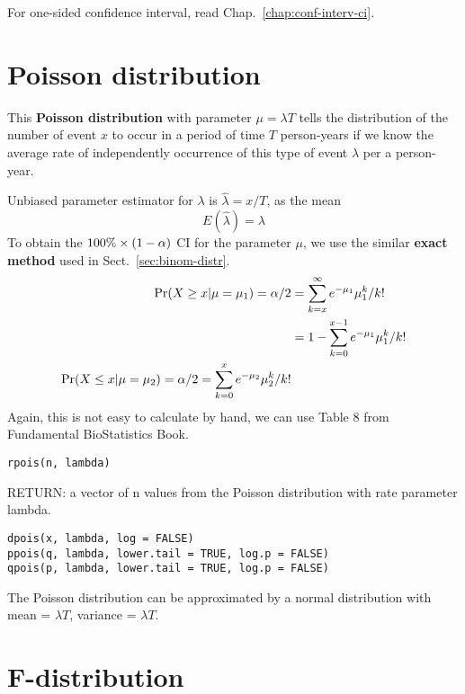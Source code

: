 For one-sided confidence interval, read
Chap.~\ref{chap:conf-interv-ci}. 

\section{Poisson distribution}
\label{sec:poisson-distribution}

This {\bf Poisson distribution} with parameter $\mu=\lambda T$ tells
the distribution of the number of event $x$ to occur in a period of
time $T$ person-years if we know the average rate of independently
occurrence of this type of event $\lambda$ per a person-year.

Unbiased parameter estimator for $\lambda$ is $\hat{\lambda} =
x/T$, as the mean
\begin{equation}
  \label{eq:53}
  E(\hat{\lambda}) = \lambda
\end{equation}
To obtain the $100\%\times (1-\alpha)$ CI for the parameter $\mu$, we use the similar
{\bf exact method} used in Sect.~\ref{sec:binom-distr}.
\begin{equation}
  \label{eq:54}
  \begin{split}
    \text{Pr}(X\ge x|\mu=\mu_1) = \alpha/2 &= \sum^\infty_{k=x} 
    e^{-\mu_1} \mu_1^{k}/k! \\
    &= 1 -  \sum^{x-1}_{k=0} 
    e^{-\mu_1} \mu_1^{k}/k! \\
    \text{Pr}(X\le x|\mu=\mu_2) = \alpha/2 = \sum^{x}_{k=0}
    e^{-\mu_2} \mu_2^{k}/k!
  \end{split}
\end{equation}
Again, this is not easy to calculate by hand, we can use Table 8 from
Fundamental BioStatistics Book. 


\begin{verbatim}
rpois(n, lambda)
\end{verbatim}
RETURN: a vector of n values from the Poisson distribution with rate
parameter lambda.


\begin{verbatim}
dpois(x, lambda, log = FALSE)
ppois(q, lambda, lower.tail = TRUE, log.p = FALSE)
qpois(p, lambda, lower.tail = TRUE, log.p = FALSE)
\end{verbatim}

The Poisson distribution can be approximated by a normal distribution
with mean = $\lambda T$, variance = $\lambda T$.

\section{F-distribution}
\label{sec:f-distribution}

